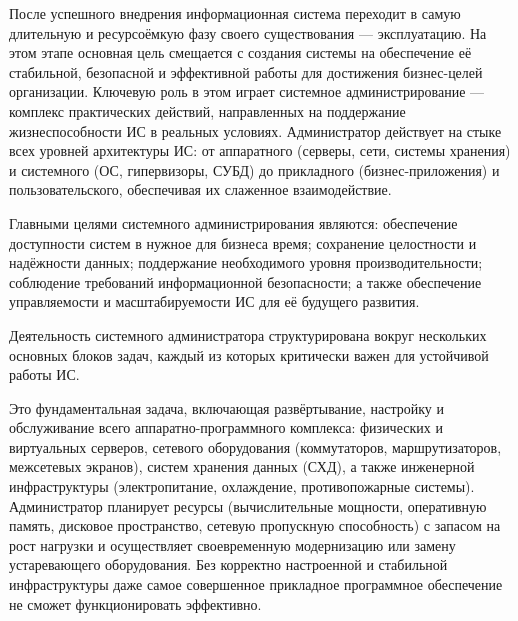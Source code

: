 \documentclass{SibFU-docs}
\begin{document}
После успешного внедрения информационная система переходит в самую длительную и ресурсоёмкую фазу своего существования — эксплуатацию. На этом этапе основная цель смещается с создания системы на обеспечение её стабильной, безопасной и эффективной работы для достижения бизнес-целей организации. Ключевую роль в этом играет системное администрирование — комплекс практических действий, направленных на поддержание жизнеспособности ИС в реальных условиях. Администратор действует на стыке всех уровней архитектуры ИС: от аппаратного (серверы, сети, системы хранения) и системного (ОС, гипервизоры, СУБД) до прикладного (бизнес-приложения) и пользовательского, обеспечивая их слаженное взаимодействие. \cite{Murphy2016SRE, studfile_admin_ib_2025}

Главными целями системного администрирования являются: обеспечение доступности систем в нужное для бизнеса время; сохранение целостности и надёжности данных; поддержание необходимого уровня производительности; соблюдение требований информационной безопасности; а также обеспечение управляемости и масштабируемости ИС для её будущего развития.


Деятельность системного администратора структурирована вокруг нескольких основных блоков задач, каждый из которых критически важен для устойчивой работы ИС.


Это фундаментальная задача, включающая развёртывание, настройку и обслуживание всего аппаратно-программного комплекса: физических и виртуальных серверов, сетевого оборудования (коммутаторов, маршрутизаторов, межсетевых экранов), систем хранения данных (СХД), а также инженерной инфраструктуры (электропитание, охлаждение, противопожарные системы). Администратор планирует ресурсы (вычислительные мощности, оперативную память, дисковое пространство, сетевую пропускную способность) с запасом на рост нагрузки и осуществляет своевременную модернизацию или замену устаревающего оборудования. Без корректно настроенной и стабильной инфраструктуры даже самое совершенное прикладное программное обеспечение не сможет функционировать эффективно.

\end{document}
